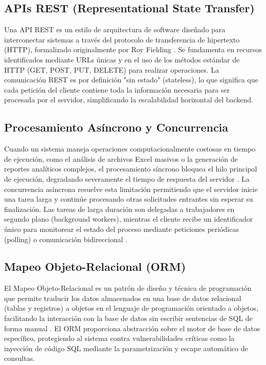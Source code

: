 \subsection{APIs REST (Representational State Transfer)}
Una API REST es un estilo de arquitectura de software diseñado para interconectar sistemas a través del protocolo de transferencia de hipertexto (HTTP), formalizado originalmente por Roy Fielding \cite{fielding2000}. Se fundamenta en recursos identificados mediante URLs únicas y en el uso de los métodos estándar de HTTP (GET, POST, PUT, DELETE) para realizar operaciones. La comunicación REST es por definición "sin estado" (stateless), lo que significa que cada petición del cliente contiene toda la información necesaria para ser procesada por el servidor, simplificando la escalabilidad horizontal del backend.

\subsection{Procesamiento Asíncrono y Concurrencia}
Cuando un sistema maneja operaciones computacionalmente costosas en tiempo de ejecución, como el análisis de archivos Excel masivos o la generación de reportes analíticos complejos, el procesamiento síncrono bloquea el hilo principal de ejecución, degradando severamente el tiempo de respuesta del servidor \cite{kleppmann2017}. La concurrencia asíncrona resuelve esta limitación permitiendo que el servidor inicie una tarea larga y continúe procesando otras solicitudes entrantes sin esperar su finalización. Las tareas de larga duración son delegadas a trabajadores en segundo plano (background workers), mientras el cliente recibe un identificador único para monitorear el estado del proceso mediante peticiones periódicas (polling) o comunicación bidireccional \cite{kleppmann2017}.

\subsection{Mapeo Objeto-Relacional (ORM)}
El Mapeo Objeto-Relacional es un patrón de diseño y técnica de programación que permite traducir los datos almacenados en una base de datos relacional (tablas y registros) a objetos en el lenguaje de programación orientado a objetos, facilitando la interacción con la base de datos sin escribir sentencias de SQL de forma manual \cite{fowler2002}. El ORM proporciona abstracción sobre el motor de base de datos específico, protegiendo al sistema contra vulnerabilidades críticas como la inyección de código SQL mediante la parametrización y escape automático de consultas.



